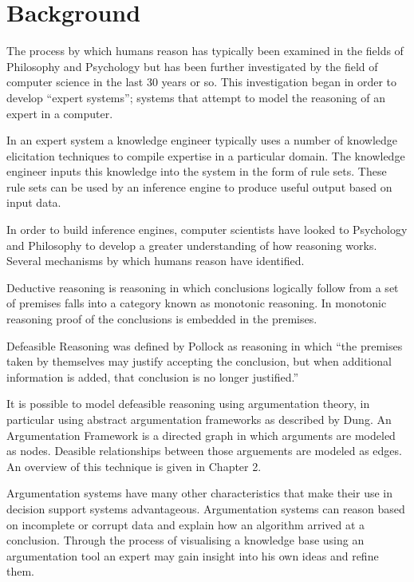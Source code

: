 
\section{Background}

The process by which humans reason has typically been examined in the fields of Philosophy and Psychology but has been further investigated by the field of computer science in the last 30 years or so. This investigation began in order to develop ``expert systems''; systems that attempt to model the reasoning of an expert in a computer.

In an expert system a knowledge engineer typically uses a number of knowledge elicitation techniques to compile expertise in a particular domain. The knowledge engineer inputs this knowledge into the system in the form of rule sets. These rule sets can be used by an inference engine to produce useful output based on input data. 

In order to build inference engines, computer scientists have looked to Psychology and Philosophy to develop a greater understanding of how reasoning works. Several mechanisms by which humans reason have identified.

Deductive reasoning is reasoning in which conclusions logically follow from a set of premises falls into a category known as monotonic reasoning. In monotonic reasoning proof of the conclusions is embedded in the premises.

Defeasible Reasoning was defined by Pollock as reasoning in which ``the premises taken by themselves may justify accepting the conclusion, but when additional information is added, that conclusion is no longer justified.''\cite{pollock1987defeasible}

It is possible to model defeasible reasoning using argumentation theory, in particular using abstract argumentation frameworks as described by Dung.\cite{dung1995acceptability} An Argumentation Framework is a directed graph in which arguments are modeled as nodes. Deasible relationships between those arguements are modeled as edges. An overview of this technique is given in Chapter 2.

Argumentation systems have many other characteristics that make their use in decision support systems advantageous. Argumentation systems can reason based on incomplete or corrupt data and explain how an algorithm arrived at a conclusion. Through the process of visualising a knowledge base using an argumentation tool an expert may gain insight into his own ideas and refine them. 

